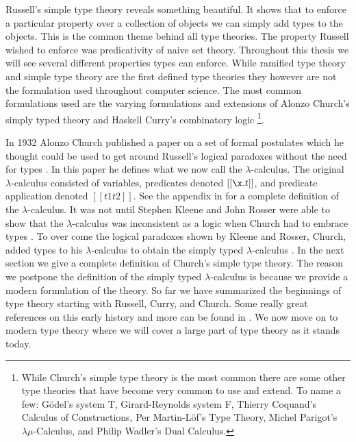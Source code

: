 Russell's simple type theory reveals something beautiful.  It shows
that to enforce a particular property over a collection of objects we
can simply add types to the objects.  This is the common theme behind
all type theories.  The property Russell wished to enforce was
predicativity of naive set theory.  Throughout this thesis we will see
several different properties types can enforce.  While ramified type
theory and simple type theory are the first defined type theories they
however are not the formulation used throughout computer science.  The
most common formulations used are the varying formulations and
extensions of Alonzo Church's simply typed theory and Haskell Curry's
combinatory logic \cite{Church:1940,Cardone:2006} 
\footnote{While Church's simple type theory is the most common there
  are some other type theories that have become very common to use and
  extend.  To name a few: G\"odel's system T, Girard-Reynolds system
  F, Thierry Coquand's Calculus of Constructions,
  Per Martin-L\"of's Type Theory, Michel Parigot's
  $\lambda\mu$-Calculus, and Philip Wadler's Dual Calculus.}.  

In 1932 Alonzo Church published a paper on a set of formal postulates
which he thought could be used to get around Russell's logical
paradoxes without the need for types \cite{Church:1933}.  In this
paper he defines what we now call the
$\lambda$-calculus.  The original
$\lambda$-calculus consisted of variables, predicates denoted
$[[\x.t]]$, and predicate application denoted $[[t1 t2]]$.  See the
appendix in \cite{Eades:2014-full} for a complete definition of the $\lambda$-calculus.  It was
not until Stephen Kleene and John Rosser were able to show that the
$\lambda$-calculus was inconsistent as a logic when Church had to
embrace types \cite{Kleene:1935}.  To over come the logical paradoxes
shown by Kleene and Rosser, Church, added types to his
$\lambda$-calculus to obtain the simply typed $\lambda$-calculus
\cite{Church:1940,Andrews:2009}.  In the next section we give a
complete definition of Church's simple type theory.  The reason we
postpone the definition of the simply typed $\lambda$-calculus is
because we provide a modern formulation of the theory.  So far we have
summarized the beginnings of type theory starting with Russell, Curry,
and Church.  Some really great references on this early history and
more can be found in
\cite{Cardone:2006,Coquand:2010b,Barendregt:1992}.  We now move on to
modern type theory where we will cover a large part of type theory as
it stands today.

